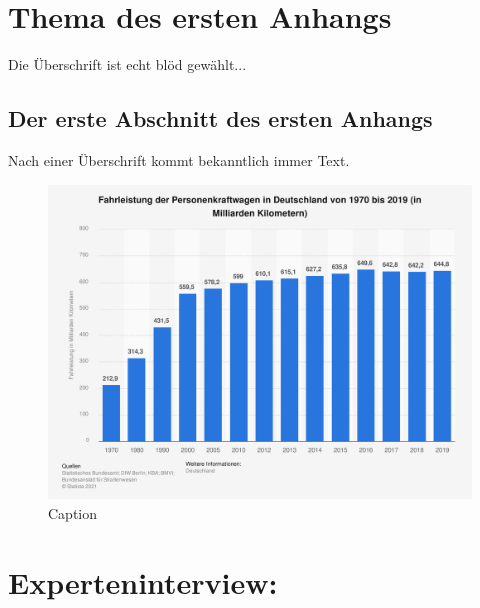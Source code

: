 \chapter{Thema des ersten Anhangs}
\label{sec:ThemaDesErstenAnhangs}
Die Überschrift ist echt blöd gewählt...
\section{Der erste Abschnitt des ersten Anhangs}
Nach einer Überschrift kommt bekanntlich immer Text.

\begin{figure}
    \centering
    \includegraphics[width=1\linewidth]{bilder/statistic_id2984_fahrleistung-von-pkw-in-deutschland-bis-2019.pdf}
    \caption{Caption}
    \label{fig:my_label_im_anhang}
\end{figure}


\chapter{Experteninterview: \citeauthor{Interviewpartnerin2021}}

